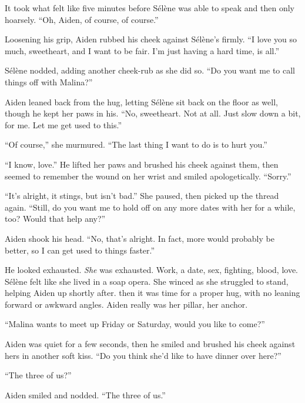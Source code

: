 It took what felt like five minutes before Sélène was able to speak and then only hoarsely. ``Oh, Aiden, of course, of course.''

Loosening his grip, Aiden rubbed his cheek against Sélène's firmly. ``I love you so much, sweetheart, and I want to be fair. I'm just having a hard time, is all.''

Sélène nodded, adding another cheek-rub as she did so. ``Do you want me to call things off with Malina?''

Aiden leaned back from the hug, letting Sélène sit back on the floor as well, though he kept her paws in his. ``No, sweetheart. Not at all. Just slow down a bit, for me. Let me get used to this.''

``Of course,'' she murmured. ``The last thing I want to do is to hurt you.''

``I know, love.'' He lifted her paws and brushed his cheek against them, then seemed to remember the wound on her wrist and smiled apologetically. ``Sorry.''

``It's alright, it stings, but isn't bad.'' She paused, then picked up the thread again. ``Still, do you want me to hold off on any more dates with her for a while, too? Would that help any?''

Aiden shook his head. ``No, that's alright. In fact, more would probably be better, so I can get used to things faster.''

He looked exhausted. \emph{She} was exhausted. Work, a date, sex, fighting, blood, love. Sélène felt like she lived in a soap opera. She winced as she struggled to stand, helping Aiden up shortly after. then it was time for a proper hug, with no leaning forward or awkward angles. Aiden really was her pillar, her anchor.

``Malina wants to meet up Friday or Saturday, would you like to come?''

Aiden was quiet for a few seconds, then he smiled and brushed his cheek against hers in another soft kiss. ``Do you think she'd like to have dinner over here?''

``The three of us?''

Aiden smiled and nodded. ``The three of us.''
